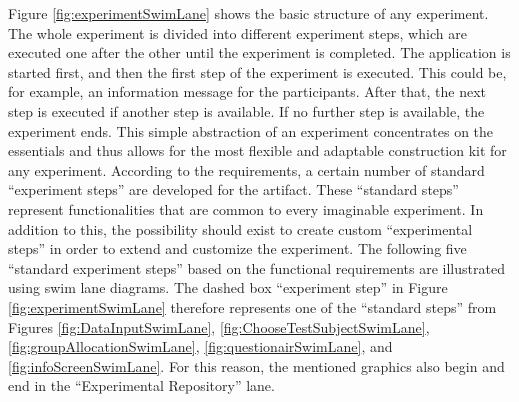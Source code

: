 
Figure \ref{fig:experimentSwimLane} shows the basic structure of any experiment. The whole experiment is divided into different experiment steps, which are executed one after the other until the experiment is completed. The application is started first, and then the first step of the experiment is executed. This could be, for example, an information message for the participants. After that, the next step is executed if another step is available. If no further step is available, the experiment ends. This simple abstraction of an experiment concentrates on the essentials and thus allows for the most flexible and adaptable construction kit for any experiment. According to the requirements, a certain number of standard \enquote{experiment steps} are developed for the artifact. These \enquote{standard steps} represent functionalities that are common to every imaginable experiment. In addition to this, the possibility should exist to create custom \enquote{experimental steps} in order to extend and customize the experiment. The following five \enquote{standard experiment steps} based on the functional requirements are illustrated using swim lane diagrams. The dashed box \enquote{experiment step} in Figure \ref{fig:experimentSwimLane} therefore represents one of the \enquote{standard steps} from Figures \ref{fig:DataInputSwimLane}, \ref{fig:ChooseTestSubjectSwimLane}, \ref{fig:groupAllocationSwimLane}, \ref{fig:questionairSwimLane}, and \ref{fig:infoScreenSwimLane}. For this reason, the mentioned graphics also begin and end in the \enquote{Experimental Repository} lane.


